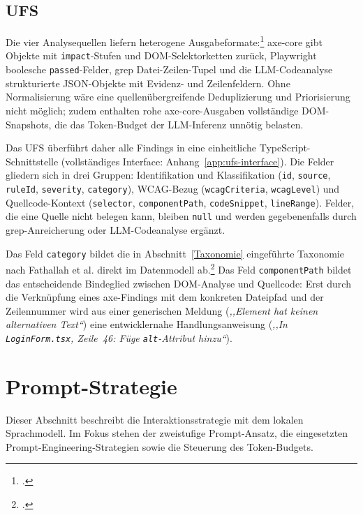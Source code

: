 \subsection{\acl{UFS}}
\label{sec:ufs}

Die vier Analysequellen liefern heterogene Ausgabeformate:\footcite[Vgl.][]{pool_testaro_2023} axe-core gibt Objekte mit \texttt{impact}-Stufen und \ac{DOM}-Selektorketten zurück, Playwright boolesche \texttt{passed}-Felder, grep Datei-Zeilen-Tupel und die \ac{LLM}-Codeanalyse strukturierte \acs{JSON}-Objekte mit Evidenz- und Zeilenfeldern. Ohne Normalisierung wäre eine quellenübergreifende Deduplizierung und Priorisierung nicht möglich; zudem enthalten rohe axe-core-Ausgaben vollständige \ac{DOM}-Snapshots, die das Token-Budget der \ac{LLM}-Inferenz unnötig belasten.

Das \ac{UFS} überführt daher alle Findings in eine einheitliche TypeScript-Schnittstelle (vollständiges Interface: Anhang~\ref{app:ufs-interface}). Die Felder gliedern sich in drei Gruppen: Identifikation und Klassifikation (\texttt{id}, \texttt{source}, \texttt{ruleId}, \texttt{severity}, \texttt{category}), \ac{WCAG}-Bezug (\texttt{wcagCriteria}, \texttt{wcagLevel}) und Quellcode-Kontext (\texttt{selector}, \texttt{componentPath}, \texttt{codeSnippet}, \texttt{lineRange}). Felder, die eine Quelle nicht belegen kann, bleiben \texttt{null} und werden gegebenenfalls durch grep-Anreicherung oder \ac{LLM}-Codeanalyse ergänzt.

Das Feld \texttt{category} bildet die in Abschnitt~\ref{Taxonomie} eingeführte Taxonomie nach Fathallah et al. direkt im Datenmodell ab.\footcite[Vgl.][]{fathallah_accessguru_2025} Das Feld \texttt{componentPath} bildet das entscheidende Bindeglied zwischen \ac{DOM}-Analyse und Quellcode: Erst durch die Verknüpfung eines axe-Findings mit dem konkreten Dateipfad und der Zeilennummer wird aus einer generischen Meldung (\emph{,,Element hat keinen alternativen Text``}) eine entwicklernahe Handlungsanweisung (\emph{,,In \texttt{LoginForm.tsx}, Zeile~46: Füge \texttt{alt}-Attribut hinzu``}).

\section{Prompt-Strategie}
\label{sec:kontextualisierung}

Dieser Abschnitt beschreibt die Interaktionsstrategie mit dem lokalen Sprachmodell. Im Fokus stehen der zweistufige Prompt-Ansatz, die eingesetzten Prompt-Engineering-Strategien sowie die Steuerung des Token-Budgets.

